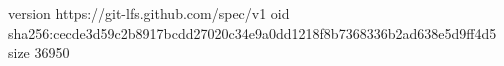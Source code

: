 version https://git-lfs.github.com/spec/v1
oid sha256:cecde3d59c2b8917bcdd27020c34e9a0dd1218f8b7368336b2ad638e5d9ff4d5
size 36950

